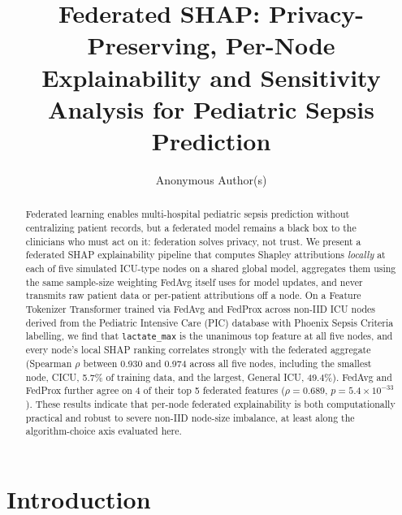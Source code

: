 \documentclass[runningheads]{llncs}
\begin{document}
\title{Federated SHAP: Privacy-Preserving, Per-Node Explainability and Sensitivity Analysis for Pediatric Sepsis Prediction}


\author{Anonymous Author(s)}

\maketitle

\begin{abstract}
Federated learning enables multi-hospital pediatric sepsis prediction without centralizing patient records, but a federated model remains a black box to the clinicians who must act on it: federation solves privacy, not trust. We present a federated SHAP explainability pipeline that computes Shapley attributions \emph{locally} at each of five simulated ICU-type nodes on a shared global model, aggregates them using the same sample-size weighting FedAvg itself uses for model updates, and never transmits raw patient data or per-patient attributions off a node. On a Feature Tokenizer Transformer trained via FedAvg and FedProx across non-IID ICU nodes derived from the Pediatric Intensive Care (PIC) database with Phoenix Sepsis Criteria labelling, we find that \texttt{lactate\_max} is the unanimous top feature at all five nodes, and every node's local SHAP ranking correlates strongly with the federated aggregate (Spearman $\rho$ between 0.930 and 0.974 across all five nodes, including the smallest node, CICU, 5.7\% of training data, and the largest, General ICU, 49.4\%). FedAvg and FedProx further agree on 4 of their top 5 federated features ($\rho = 0.689$, $p = 5.4\times10^{-33}$). These results indicate that per-node federated explainability is both computationally practical and robust to severe non-IID node-size imbalance, at least along the algorithm-choice axis evaluated here.
\end{abstract}

\section{Introduction}\label{sec:intro}
\end{document}
